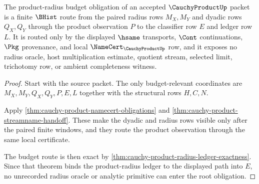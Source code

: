 \begin{theorem}
\label{thm:cauchy-product-root-budget-obligations}
The product-radius budget obligation of an accepted $\CauchyProductUp$ packet is a finite $\BHist$ route from the paired radius rows $M_X,M_Y$ and dyadic rows $Q_X,Q_Y$ through the product observation $P$ to the classifier row $E$ and ledger row $L$. It is routed only by the displayed $\hsame$ transports, $\Cont$ continuations, $\Pkg$ provenance, and local $\NameCert_{\CauchyProductUp}$ row, and it exposes no radius oracle, host multiplication estimate, quotient stream, selected limit, trichotomy row, or ambient completeness witness.
\end{theorem}
\begin{proof}
Start with the source packet. The only budget-relevant coordinates are $M_X,M_Y,Q_X,Q_Y,P,E,L$ together with the structural rows $H,C,N$.

Apply \autoref{thm:cauchy-product-namecert-obligations} and \autoref{thm:cauchy-product-streamname-handoff}. These make the dyadic and radius rows visible only after the paired finite windows, and they route the product observation through the same local certificate.

The budget route is then exact by \autoref{thm:cauchy-product-radius-ledger-exactness}. Since that theorem binds the product-radius ledger to the displayed path into $E$, no unrecorded radius oracle or analytic primitive can enter the root obligation.
\end{proof}

